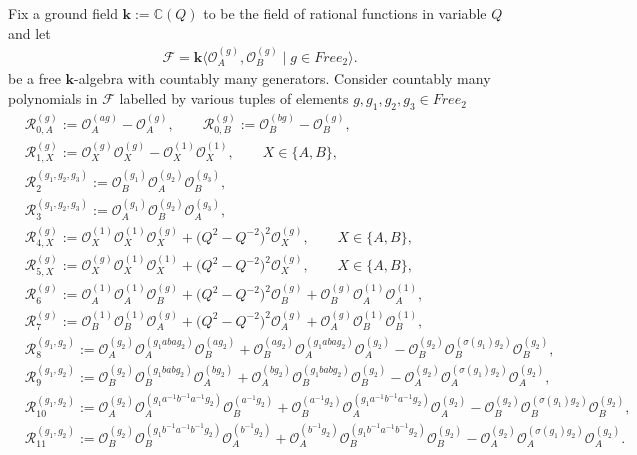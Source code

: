 \documentclass{amsart}
\newcommand{\Oa}{\mathcal O_A}
\newcommand{\Ob}{\mathcal O_B}
\newcommand{\R}{\mathcal R}
\begin{document}
Fix a ground field $\mathbf k:=\mathbb C(Q)$ to be the field of rational functions in variable $Q$ and let
\begin{align*}
\mathcal F=\mathbf k\big\langle\Oa^{(g)},\Ob^{(g)}\;\big|\;g\in Free_2\big\rangle.
\end{align*}
be a free $\mathbf k$-algebra with countably many generators. Consider countably many polynomials in $\mathcal F$ labelled by various tuples of elements $g,g_1,g_2,g_3\in Free_2$
\begin{subequations}
\begin{align}
&\R_{0,A}^{(g)}:=\Oa^{(ag)}-\Oa^{(g)},\qquad\R_{0,B}^{(g)}:=\Ob^{(bg)}-\Ob^{(g)},
\label{eq:Relation0Xg}\\[1em]
&\R_{1,X}^{(g)}:=\mathcal O_X^{(g)}\mathcal O_X^{(g)}-\mathcal O_X^{(1)}\mathcal O_X^{(1)},\qquad X\in\{A,B\},
\label{eq:Relation1Xg}\\[1em]
&\R_2^{(g_1,g_2,g_3)}:=\Ob^{(g_1)}\Oa^{(g_2)}\Ob^{(g_3)},
\label{eq:Relation2g1g2g3}\\
&\R_3^{(g_1,g_2,g_3)}:=\Oa^{(g_1)}\Ob^{(g_2)}\Oa^{(g_3)},
\label{eq:Relation3g1g2g3}\\[1em]
&\R_{4,X}^{(g)}:=\mathcal O_X^{(1)}\mathcal O_X^{(1)}\mathcal O_X^{(g)}+\big(Q^2-Q^{-2}\big)^2\mathcal O_X^{(g)},\qquad X\in\{A,B\},
\label{eq:Relation4Xg}\\
&\R_{5,X}^{(g)}:=\mathcal O_X^{(g)}\mathcal O_X^{(1)}\mathcal O_X^{(1)}+\big(Q^2-Q^{-2}\big)^2\mathcal O_X^{(g)},\qquad X\in\{A,B\},
\label{eq:Relation5Xg}\\[1em]
&\R_6^{(g)}:=\Oa^{(1)}\Oa^{(1)}\Ob^{(g)}+\big(Q^2-Q^{-2}\big)^2\Ob^{(g)}+\Ob^{(g)}\Oa^{(1)}\Oa^{(1)},
\label{eq:Relation6g}\\
&\R_7^{(g)}:=\Ob^{(1)}\Ob^{(1)}\Oa^{(g)}+\big(Q^2-Q^{-2}\big)^2\Oa^{(g)}+\Oa^{(g)}\Ob^{(1)}\Ob^{(1)},
\label{eq:Relation7g}\\[1em]
&\R_8^{(g_1,g_2)}:=\Oa^{(g_2)}\Oa^{(g_1abag_2)}\Ob^{(ag_2)}+\Ob^{(ag_2)}\Oa^{(g_1abag_2)}\Oa^{(g_2)}-\Ob^{(g_2)}\Ob^{(\sigma(g_1)g_2)}\Ob^{(g_2)},\\
&\R_9^{(g_1,g_2)}:=\Ob^{(g_2)}\Ob^{(g_1babg_2)}\Oa^{(bg_2)}+\Oa^{(bg_2)}\Ob^{(g_1babg_2)}\Ob^{(g_2)}-\Oa^{(g_2)}\Oa^{(\sigma(g_1)g_2)}\Oa^{(g_2)},\\[1em]
&\R_{10}^{(g_1,g_2)}:=\Oa^{(g_2)}\Oa^{(g_1a^{-1}b^{-1}a^{-1}g_2)}\Ob^{(a^{-1}g_2)}+\Ob^{(a^{-1}g_2)}\Oa^{(g_1a^{-1}b^{-1}a^{-1}g_2)}\Oa^{(g_2)}-\Ob^{(g_2)}\Ob^{(\sigma(g_1)g_2)}\Ob^{(g_2)},\\
&\R_{11}^{(g_1,g_2)}:=\Ob^{(g_2)}\Ob^{(g_1b^{-1}a^{-1}b^{-1}g_2)}\Oa^{(b^{-1}g_2)}+\Oa^{(b^{-1}g_2)}\Ob^{(g_1b^{-1}a^{-1}b^{-1}g_2)}\Ob^{(g_2)}-\Oa^{(g_2)}\Oa^{(\sigma(g_1)g_2)}\Oa^{(g_2)}.
\end{align}
\label{eq:DefiningRelationsK2Full}
\end{subequations}
\end{document}
